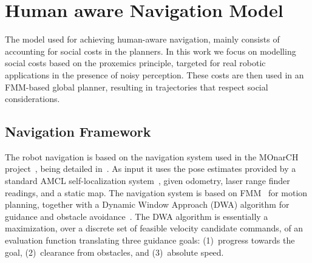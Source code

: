\section{Human aware Navigation Model}
\label{social_nav}



The model used for achieving human-aware navigation, mainly consists of accounting for social costs in the planners. In this work we focus on modelling social costs based on the proxemics principle, targeted for real robotic applications in the presence of noisy perception. These costs are then used in an FMM-based global planner, resulting in trajectories that respect social considerations.%


\subsection{Navigation Framework}

The robot navigation is based on the navigation system used in the MOnarCH project~\cite{monarch2013}, being detailed in~\cite{ventura2015}. As input it uses the pose estimates provided by a standard AMCL self-localization system~\cite{amcl}, given odometry, laser range finder readings, and a static map. The navigation system is based on FMM~\cite{sethian1999fast} for motion planning, together with a Dynamic Window Approach (DWA) algorithm for guidance and obstacle avoidance~\cite{fox1997dynamic}. The DWA algorithm is essentially a maximization, over a discrete set of feasible velocity candidate commands, of an evaluation function translating three guidance goals: (1)~progress towards the goal, (2)~clearance from obstacles, and (3)~absolute speed.

